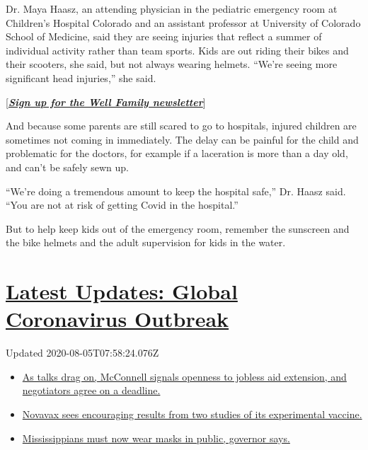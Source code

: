 Dr. Maya Haasz, an attending physician in the pediatric emergency room
at Children's Hospital Colorado and an assistant professor at University
of Colorado School of Medicine, said they are seeing injuries that
reflect a summer of individual activity rather than team sports. Kids
are out riding their bikes and their scooters, she said, but not always
wearing helmets. ``We're seeing more significant head injuries,'' she
said.

{[}\textbf{\href{https://www.nytimes3xbfgragh.onion/newsletters/well-family}{\emph{Sign
up for the Well Family newsletter}}}{]}

And because some parents are still scared to go to hospitals, injured
children are sometimes not coming in immediately. The delay can be
painful for the child and problematic for the doctors, for example if a
laceration is more than a day old, and can't be safely sewn up.

``We're doing a tremendous amount to keep the hospital safe,'' Dr. Haasz
said. ``You are not at risk of getting Covid in the hospital.''

But to help keep kids out of the emergency room, remember the sunscreen
and the bike helmets and the adult supervision for kids in the water.

\hypertarget{latest-updates-global-coronavirus-outbreak}{%
\section{\texorpdfstring{\href{https://www.nytimes3xbfgragh.onion/2020/08/04/world/coronavirus-cases.html?action=click\&pgtype=Article\&state=default\&region=MAIN_CONTENT_1\&context=storylines_live_updates}{Latest
Updates: Global Coronavirus
Outbreak}}{Latest Updates: Global Coronavirus Outbreak}}\label{latest-updates-global-coronavirus-outbreak}}

Updated 2020-08-05T07:58:24.076Z

\begin{itemize}
\tightlist
\item
  \href{https://www.nytimes3xbfgragh.onion/2020/08/04/world/coronavirus-cases.html?action=click\&pgtype=Article\&state=default\&region=MAIN_CONTENT_1\&context=storylines_live_updates\#link-762df92}{As
  talks drag on, McConnell signals openness to jobless aid extension,
  and negotiators agree on a deadline.}
\item
  \href{https://www.nytimes3xbfgragh.onion/2020/08/04/world/coronavirus-cases.html?action=click\&pgtype=Article\&state=default\&region=MAIN_CONTENT_1\&context=storylines_live_updates\#link-1228a480}{Novavax
  sees encouraging results from two studies of its experimental
  vaccine.}
\item
  \href{https://www.nytimes3xbfgragh.onion/2020/08/04/world/coronavirus-cases.html?action=click\&pgtype=Article\&state=default\&region=MAIN_CONTENT_1\&context=storylines_live_updates\#link-794484ed}{Mississippians
  must now wear masks in public, governor says.}
\end{itemize}

